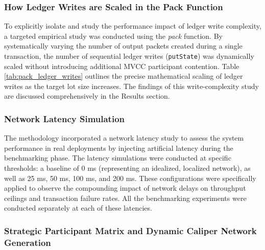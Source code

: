 \documentclass[12pt]{article}
\begin{document}
\subsubsection{How Ledger Writes are Scaled in the Pack Function}
To explicitly isolate and study the performance impact of ledger write complexity, a targeted empirical study was conducted using the \textit{pack} function. By systematically varying the number of output packets created during a single transaction, the number of sequential ledger writes (\texttt{putState}) was dynamically scaled without introducing additional MVCC participant contention. Table \ref{tab:pack_ledger_writes} outlines the precise mathematical scaling of ledger writes as the target lot size increases. The findings of this write-complexity study are discussed comprehensively in the Results section.
\begin{table}[H]
\centering
\caption{Ledger Write Complexity Scaling based on Target Lot Size}
\label{tab:pack_ledger_writes}
\end{table}

\subsubsection{Network Latency Simulation}
The methodology incorporated a network latency study to assess the system performance in real deployments by injecting artificial latency during the benchmarking phase. The latency simulations were conducted at specific thresholds: a baseline of 0 ms (representing an idealized, localized network), as well as  25 ms, 50 ms, 100 ms, and 200 ms. These configurations were specifically applied to observe the compounding impact of network delays on throughput ceilings and transaction failure rates. All the benchmarking experiments were conducted separately at each of these latencies.

\subsubsection{Strategic Participant Matrix and Dynamic Caliper Network Generation}
\end{document}
